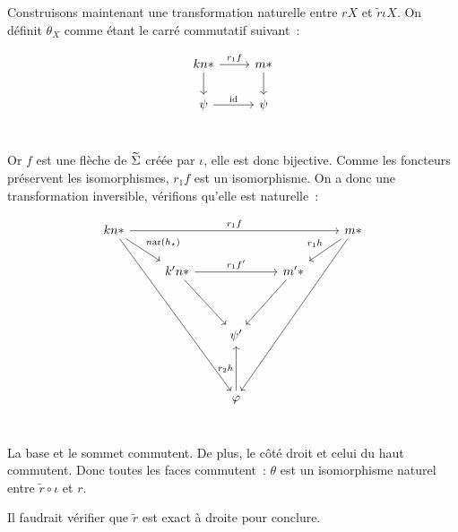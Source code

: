 \begin{pv}
    Construisons maintenant une transformation naturelle entre $rX$ et
    $\tilde{r}\iota X$. On définit $\theta_X$ comme étant le carré commutatif
    suivant~:

    \[\begin{tikzcd}
        kn\ast\arrow[r, "r_1f"]\arrow[d] & m\ast\arrow[d] \\
        \psi\arrow[r, "\id"] & \psi \\
    \end{tikzcd}\]

    Or $f$ est une flèche de $\widetilde{\Sigma}$ créée par $\iota$, elle est donc bijective. Comme
    les foncteurs préservent les isomorphismes, $r_1f$ est un isomorphisme. On a donc
    une transformation inversible, vérifions qu'elle est naturelle~:

    \[\begin{tikzcd}
        kn\ast\arrow[rrrr, "r_1f"]\arrow[dr, "n\arf(h_\star)"]\arrow[dddddrr]
            & & & & m\ast\arrow[dl, swap, "r_1h"]\arrow[dddddll] \\
        & k'n\ast\arrow[rr, "r_1f'"]\arrow[ddr]
            & & m'\ast\arrow[ddl] & \\
        & & & & \\
        & & \psi' & & \\
        & & & & \\
        & & \phi\arrow[uu, "r_2h"] & & \\
    \end{tikzcd}\]

    La base et le sommet commutent. De plus, le côté droit et celui du haut commutent.
    Donc toutes les faces commutent~: $\theta$ est un isomorphisme naturel entre
    $\tilde{r}\circ\iota$ et $r$.

    Il faudrait vérifier que $\tilde{r}$ est exact à droite pour conclure.
\end{pv}


